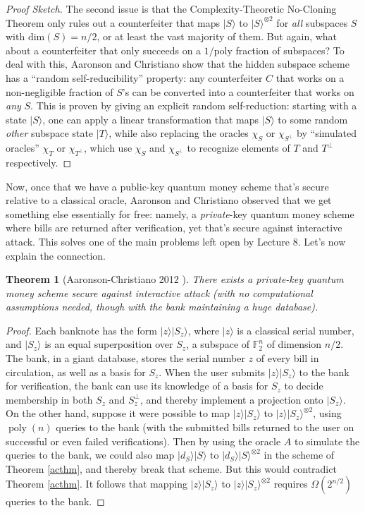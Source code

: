 \documentclass[11pt]{report}
\theoremstyle{plain}
\newtheorem{theorem}{Theorem}[section]
\theoremstyle{definition}
\newcommand{\poly}{\operatorname{poly}}
\renewcommand{\ket}[1]{|#1\rangle}
\begin{document}
\begin{proof}[Proof Sketch]
The second issue is that the Complexity-Theoretic No-Cloning Theorem only rules out a counterfeiter that maps $\ket{S}$ to $\ket{S}^{\otimes 2}$ for {\em all} subspaces $S$ with $\text{dim}(S) = n/2$, or at least the vast majority of them.  But again, what about a counterfeiter that only succeeds on a $1/\text{poly}$ fraction of subspaces?  To deal with this, Aaronson and Christiano show that the hidden subspace scheme has a ``random self-reducibility'' property: any counterfeiter $C$ that works on a non-negligible fraction of $S$'s can be converted into a counterfeiter that works on {\em any} $S$.  This is proven by giving an explicit random self-reduction: starting with a state $\ket{S}$, one can apply a linear transformation that maps $\ket{S}$ to some random {\em other} subspace state $\ket{T}$, while also replacing the oracles $\chi_S$ or $\chi_{S^\perp}$ by ``simulated oracles'' $\chi_T$ or $\chi_{T^\perp}$, which use $\chi_S$ and $\chi_{S^\perp}$ to recognize elements of $T$ and $T^{\perp}$ respectively.
\end{proof}

Now, once that we have a public-key quantum money scheme that's secure relative to a classical oracle, Aaronson and Christiano \cite{achristiano} observed that we get something else essentially for free: namely, a {\em private}-key quantum money scheme where bills are returned after verification, yet that's secure against interactive attack.  This solves one of the main problems left open by Lecture 8.  Let's now explain the connection.

\begin{theorem}[Aaronson-Christiano 2012 \cite{achristiano}]
There exists a private-key quantum money scheme secure against interactive attack (with no computational assumptions needed, though with the bank maintaining a huge database).
\end{theorem}
\begin{proof}
Each banknote has the form $\ket{z}\ket{S_z}$, where $\ket{z}$ is a classical serial number, and $\ket{S_z}$ is an equal superposition over $S_z$, a subspace of $\mathbb{F}_2^n$ of dimension $n/2$.  The bank, in a giant database, stores the serial number $z$ of every bill in circulation, as well as a basis for $S_z$.  When the user submits $\ket{z}\ket{S_z}$ to the bank for verification, the bank can use its knowledge of a basis for $S_z$ to decide membership in both $S_z$ and $S_z^\perp$, and thereby implement a projection onto $\ket{S_z}$.  On the other hand, suppose it were possible to map $\ket{z}\ket{S_z}$ to $\ket{z}\ket{S_z}^{\otimes 2}$, using $\poly(n)$ queries to the bank (with the submitted bills returned to the user on successful or even failed verifications).  Then by using the oracle $A$ to simulate the queries to the bank, we could also map $\ket{d_S}\ket{S}$ to $\ket{d_S}\ket{S}^{\otimes 2}$ in the scheme of Theorem \ref{acthm}, and thereby break that scheme.  But this would contradict Theorem \ref{acthm}.  It follows that mapping $\ket{z}\ket{S_z}$ to $\ket{z}\ket{S_z}^{\otimes 2}$ requires $\Omega(2^{n/2})$ queries to the bank.
\end{proof}
\end{document}

